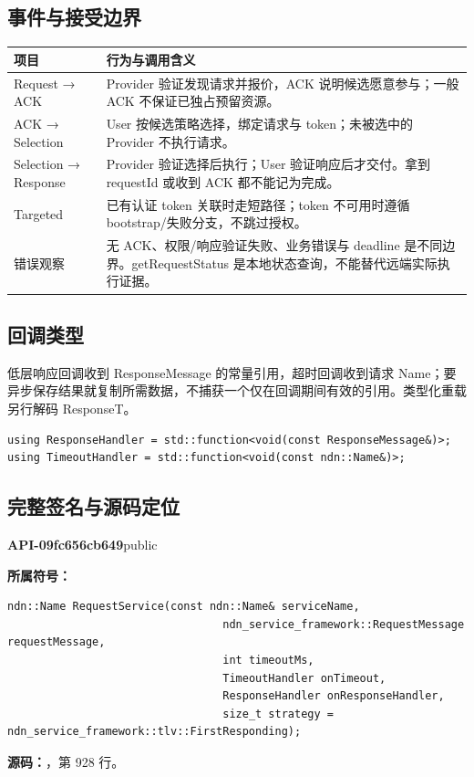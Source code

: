 \subsection{事件与接受边界}

\begin{longtable}{@{}p{43mm}p{119mm}@{}}
\toprule
项目 & 行为与调用含义 \\
\midrule\endhead
Request → ACK & Provider 验证发现请求并报价，ACK 说明候选愿意参与；一般 ACK 不保证已独占预留资源。 \\
ACK → Selection & User 按候选策略选择，绑定请求与 token；未被选中的 Provider 不执行请求。 \\
Selection → Response & Provider 验证选择后执行；User 验证响应后才交付。拿到 requestId 或收到 ACK 都不能记为完成。 \\
Targeted & 已有认证 token 关联时走短路径；token 不可用时遵循 bootstrap/失败分支，不跳过授权。 \\
错误观察 & 无 ACK、权限/响应验证失败、业务错误与 deadline 是不同边界。getRequestStatus 是本地状态查询，不能替代远端实际执行证据。 \\
\bottomrule
\end{longtable}

\subsection{回调类型}
低层响应回调收到 ResponseMessage 的常量引用，超时回调收到请求 Name；要异步保存结果就复制所需数据，不捕获一个仅在回调期间有效的引用。类型化重载另行解码 ResponseT。
\begin{Verbatim}[fontsize=\footnotesize,breaklines,breakanywhere]
using ResponseHandler = std::function<void(const ResponseMessage&)>;
using TimeoutHandler = std::function<void(const ndn::Name&)>;
\end{Verbatim}

\subsection{完整签名与源码定位}

\textbf{API-09fc656cb649}\quad public\par
\textbf{所属符号：}\par
\begin{Verbatim}[fontsize=\footnotesize,breaklines,breakanywhere]
ndn::Name RequestService(const ndn::Name& serviceName,
                                 ndn_service_framework::RequestMessage requestMessage,
                                 int timeoutMs,
                                 TimeoutHandler onTimeout,
                                 ResponseHandler onResponseHandler,
                                 size_t strategy = ndn_service_framework::tlv::FirstResponding);
\end{Verbatim}
\textbf{源码：}，第 928 行。\par

